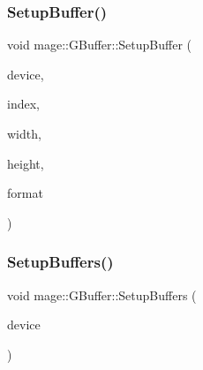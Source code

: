 \hypertarget{structmage_1_1_g_buffer_a3d5b181c9f515283548f482e70b5984f}{}\label{structmage_1_1_g_buffer_a3d5b181c9f515283548f482e70b5984f} 
\subsubsection{\texorpdfstring{Setup\+Buffer()}{SetupBuffer()}}
{\footnotesize\ttfamily void mage\+::\+G\+Buffer\+::\+Setup\+Buffer (\begin{DoxyParamCaption}\item[{I\+D3\+D11\+Device2 $\ast$}]{device,  }\item[{\hyperlink{namespacemage_a41c104c036fba3756a74e19f793eeaa1}{U32}}]{index,  }\item[{\hyperlink{namespacemage_a41c104c036fba3756a74e19f793eeaa1}{U32}}]{width,  }\item[{\hyperlink{namespacemage_a41c104c036fba3756a74e19f793eeaa1}{U32}}]{height,  }\item[{D\+X\+G\+I\+\_\+\+F\+O\+R\+M\+AT}]{format }\end{DoxyParamCaption})\hspace{0.3cm}{\ttfamily [private]}}

\hypertarget{structmage_1_1_g_buffer_a5b0d4c4b0e29afad8524d11f66a5ff3d}{}\label{structmage_1_1_g_buffer_a5b0d4c4b0e29afad8524d11f66a5ff3d} 
\subsubsection{\texorpdfstring{Setup\+Buffers()}{SetupBuffers()}}
{\footnotesize\ttfamily void mage\+::\+G\+Buffer\+::\+Setup\+Buffers (\begin{DoxyParamCaption}\item[{I\+D3\+D11\+Device2 $\ast$}]{device }\end{DoxyParamCaption})\hspace{0.3cm}{\ttfamily [private]}}

\hypertarget{structmage_1_1_g_buffer_a37217bae0d08d050223d2e0d318580aa}{}\label{structmage_1_1_g_buffer_a37217bae0d08d050223d2e0d318580aa} 
